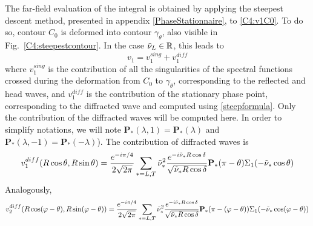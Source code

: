 The far-field evaluation of the integral is obtained by applying the steepest descent method, presented in appendix \ref{PhaseStationnaire}, to \eqref{C4:v1C0}. To do so, contour $C_0$ is deformed into contour $\gamma_{\theta}$, also visible in Fig.~\ref{C4:steepestcontour}. In the case $\tilde{\nu}_L \in \mathbb{R}$, this leads to
\begin{equation}
v_1=v_1^{sing}+v_1^{diff}
\end{equation}
where $v_1^{sing}$ is the contribution of all the singularities of the spectral functions crossed during the deformation from $C_0$ to $\gamma_{\theta}$, corresponding to the reflected and head waves, and $v_1^{diff}$ is the contribution of the stationary phase point, corresponding to the diffracted wave and computed using \eqref{steepformula}. Only the contribution of the diffracted waves will be computed here. In order to simplify notations, we will note $\mathbf{P}_*(\lambda,1)=\mathbf{P}_*(\lambda)$ and $\mathbf{P}_*(\lambda,-1)=\mathbf{P}_*(-\lambda)$). The contribution of diffracted waves is 
\begin{equation}
v_1^{diff}(R\cos\theta,R\sin\theta)=\frac{e^{-i\pi/4}}{2\sqrt{2\pi}}\sum_{*=L,T}\tilde{\nu}_*^2\frac{e^{-i\tilde{\nu}_*R\cos\delta}}{\sqrt{\tilde{\nu}_*R\cos\delta}}\mathbf{P_*}(\pi-\theta)\Sigma_1(-\tilde{\nu}_*\cos\theta)
\end{equation}
Analogously,
\begin{equation}
v_2^{diff}(R\cos(\varphi-\theta),R\sin(\varphi-\theta))=\frac{e^{-i\pi/4}}{2\sqrt{2\pi}}\sum_{*=L,T}\tilde{\nu}_*^2\frac{e^{-i\tilde{\nu}_*R\cos\delta}}{\sqrt{\tilde{\nu}_*R\cos\delta}}\mathbf{P_*}(\pi-(\varphi-\theta))\Sigma_1(-\tilde{\nu}_*\cos(\varphi-\theta))
\end{equation}

